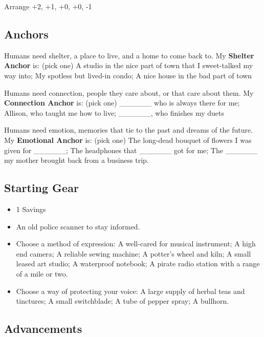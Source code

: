 \documentclass[
  oneside,
  statementpaper,
  9pt]{memoir}
\begin{document}
Arrange +2, +1, +0, +0, -1

\hypertarget{anchors-9}{%
\subsection{Anchors}\label{anchors-9}}

Humans need shelter, a place to live, and a home to come back to. My
\textbf{Shelter Anchor} is: (pick one) A studio in the nice part of town
that I sweet-talked my way into; My spotless but lived-in condo; A nice
house in the bad part of town

Humans need connection, people they care about, or that care about them.
My \textbf{Connection Anchor} is: (pick one) \_\_\_\_\_\_ who is always
there for me; Allison, who taught me how to live; \_\_\_\_\_\_, who
finishes my duets

Humans need emotion, memories that tie to the past and dreams of the
future. My \textbf{Emotional Anchor} is: (pick one) The long-dead
bouquet of flowers I was given for \_\_\_\_\_\_; The headphones that
\_\_\_\_\_\_ got for me; The \_\_\_\_\_\_ my mother brought back from a
business trip.

\hypertarget{starting-gear-7}{%
\subsection{Starting Gear}\label{starting-gear-7}}

\begin{itemize}
\tightlist
\item
  1 Savings
\item
  An old police scanner to stay informed.
\item
  Choose a method of expression: A well-cared for musical instrument; A
  high end camera; A reliable sewing machine; A potter's wheel and kiln;
  A small leased art studio; A waterproof notebook; A pirate radio
  station with a range of a mile or two.
\item
  Choose a way of protecting your voice: A large supply of herbal teas
  and tinctures; A small switchblade; A tube of pepper spray; A
  bullhorn.
\end{itemize}

\hypertarget{advancements-7}{%
\subsection{Advancements}\label{advancements-7}}
\end{document}
